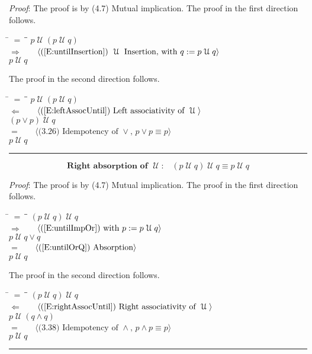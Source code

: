 \documentclass[12pt, fleqn, leqno]{article}
\newcommand{\lgap}{2pt}                             %
\newcommand{\mymathindent}{24pt}                    %
\newcommand{\impl}{\ensuremath{\Rightarrow}}        %
\newcommand{\foll}{\ensuremath{\Leftarrow}}         %
\newcommand{\Until}{\;\mathcal{U}\;}
\newcommand{\myqed}{\rule[-.23ex]{1.2ex}{2.0ex}}
\newcommand{\myqedtab}{\hspace{384pt}}              %
\newcommand{\Gll} {\langle}                         %
\newcommand{\Ggg} {\rangle}                         %
\newcommand{\Hint}[1]     {\ \ \ $\Gll              \mbox{#1} \Ggg$ }   %
\begin{document}
\emph{Proof}: The proof is by (4.7) Mutual implication.
The proof in the first direction follows.
\begin{tabbing}
\hspace{\mymathindent} \= $= \;$ \= \myqedtab \= \kill
\> \> $p \Until (p \Until q)$\\[\lgap]
\> $\impl$ \> \Hint{(\ref{E:untilInsertion}) $\Until$ Insertion, with $q:=p\Until q$} \\[\lgap]
\> \> $p \Until q$\\
\end{tabbing}
The proof in the second direction follows.
\begin{tabbing}
\hspace{\mymathindent} \= $= \;$ \= \myqedtab \= \kill
\> \> $p \Until (p \Until q)$\\[\lgap]
\> $\foll$ \> \Hint{(\ref{E:leftAssocUntil}) Left associativity of $\Until$} \\[\lgap]
\> \> $(p\lor p) \Until q$\\[\lgap]
\> $=$ \> \Hint{(3.26) Idempotency of $\lor$, $p \lor p \equiv p$} \\[\lgap]
\> \> $p \Until q$ \quad \myqed
\end{tabbing}
\begin{equation}\label{E:untilIdemR}
\textbf{Right absorption of $\Until$:}\quad (p \Until q) \Until q \equiv p \Until q
\end{equation}

\emph{Proof}: The proof is by (4.7) Mutual implication.
The proof in the first direction follows.
\begin{tabbing}
\hspace{\mymathindent} \= $= \;$ \= \myqedtab \= \kill
\> \> $(p \Until q) \Until q$\\[\lgap]
\> $\impl$ \> \Hint{(\ref{E:untilImpOr}) with $p:=p\Until q$} \\[\lgap]
\> \> $p \Until q \lor q$\\[\lgap]
\> $=$ \> \Hint{(\ref{E:untilOrQ}) Absorption} \\[\lgap]
\> \> $p\Until q$
\end{tabbing}
The proof in the second direction follows.
\begin{tabbing}
\hspace{\mymathindent} \= $= \;$ \= \myqedtab \= \kill
\> \> $(p \Until q) \Until q$\\[\lgap]
\> $\foll$ \> \Hint{(\ref{E:rightAssocUntil}) Right associativity of $\Until$} \\[\lgap]
\> \> $p \Until (q \land q)$\\[\lgap]
\> $=$  \>  \Hint{(3.38) Idempotency of $\land$, $p\land p \equiv p$}\\[\lgap]
\> \> $p \Until q$ \quad \myqed
\end{tabbing}
\end{document}
